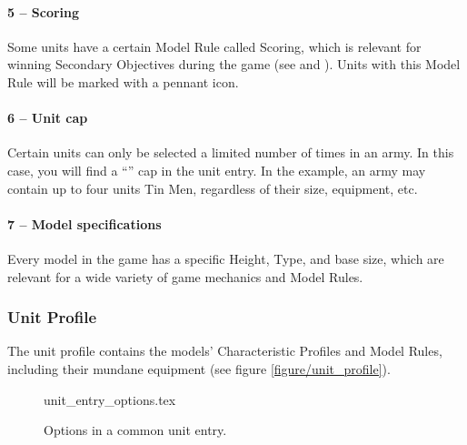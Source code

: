 \paragraph{5 -- Scoring}

Some units have a certain Model Rule called Scoring, which is relevant for winning Secondary Objectives during the game (see  and ). Units with this Model Rule will be marked with a pennant icon.

\paragraph{6 -- Unit cap}

Certain units can only be selected a limited number of times in an army. In this case, you will find a \enquote{} cap in the unit entry. In the example, an army may contain up to four units Tin Men, regardless of their size, equipment, etc.

\paragraph{7 -- Model specifications}

Every model in the game has a specific Height, Type, and base size, which are relevant for a wide variety of game mechanics and Model Rules.

\subsubsection{Unit Profile}

The unit profile contains the models' Characteristic Profiles and Model Rules, including their mundane equipment (see figure \ref{figure/unit_profile}).

\newcommand{\figTINMENOptionsTen}{10 -- Command Group Options}
\newcommand{\figTINMENOptionsEleven}{11 -- Unrestricted\\ options}
\newcommand{\figTINMENOptionsTwelve}{12 -- Restricted\\ options}
\newcommand{\figTINMENOptionsThirteen}{13 -- Model Rules}

\begin{figure}[!b]
	\vspace{-10pt}
	{unit_entry_options.tex}
	\caption{Options in a common unit entry.}
	\label{figure/unit_entry_options}
	\vspace*{15pt}
\end{figure}

